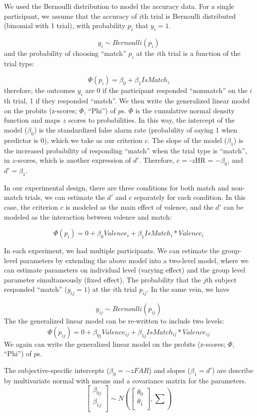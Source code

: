 \documentclass[
  man]{apa6}
\begin{document}
We used the Bernoulli distribution to model the accuracy data. For a single participant, we assume that the accuracy of \(i\)th trial is Bernoulli distributed (binomial with 1 trial), with probability \(p_{i}\) that \(y_{i} = 1\).

\[ y_{i} \sim Bernoulli(p_{i})\]
and the probability of choosing ``match'' \(p_{i}\) at the \(i\)th trial is a function of the trial type:

\[ \Phi(p_{i}) =  \beta_{0} + \beta_{1}IsMatch_{i}\]
therefore, the outcomes \(y_{i}\) are 0 if the participant responded ``nonmatch'' on the \(i\)th trial, 1 if they responded ``match''. We then write the generalized linear model on the probits (z-scores; \(\Phi\), ``Phi'') of \(p\)s. \(\Phi\) is the cumulative normal density function and maps \(z\) scores to probabilities. In this way, the intercept of the model (\(\beta_0\)) is the standardized false alarm rate (probability of saying 1 when predictor is 0), which we take as our criterion \(c\). The slope of the model (\(\beta_1\)) is the increased probability of responding ``match'' when the trial type is ``match'', in \(z\)-scores, which is another expression of \(d'\). Therefore, \(c\) = -\(z\)HR = \(-\beta_0\), and \(d' = \beta_1\).

In our experimental design, there are three conditions for both match and non-match trials, we can estimate the \(d'\) and \(c\) separately for each condition. In this case, the criterion \(c\) is modeled as the main effect of valence, and the \(d'\) can be modeled as the interaction between valence and match:

\[ \Phi(p_{i}) = 0 + \beta_{0}Valence_{i} + \beta_{1}IsMatch_{i}  * Valence_{i} \]

In each experiment, we had multiple participants. We can estimate the group-level parameters by extending the above model into a two-level model, where we can estimate parameters on individual level (varying effect) and the group level parameter simultaneously (fixed effect). The probability that the \(j\)th subject responded ``match'' (\(y_{ij} = 1\)) at the \(i\)th trial \(p_{ij}\). In the same vein, we have

\[ y_{ij} \sim Bernoulli(p_{ij})\]
The the generalized linear model can be re-written to include two levels:
\[ \Phi(p_{ij}) = 0 + \beta_{0j}Valence_{ij} + \beta_{1j}IsMatch_{ij} * Valence_{ij}\]
We again can write the generalized linear model on the probits (z-scores; \(\Phi\), ``Phi'') of \(p\)s.

The subjective-specific intercepts (\(\beta_{0} = -zFAR\)) and slopes (\(\beta_{1} = d'\)) are describe by multivariate normal with means and a covariance matrix for the parameters.
\[ \begin{bmatrix}\beta_{0j}\\
\beta_{1j}\\
\end{bmatrix} \sim N(\begin{bmatrix}\theta_{0}\\
\theta_{1}\\
\end{bmatrix}, \sum) \]
\end{document}
